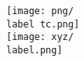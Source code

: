 \documentclass[aspectratio=169]{beamer}
\begin{document}
{\begin{frame}
    \hspace*{-0.05\linewidth}%
    \begin{minipage}{0.45\linewidth}
        \vspace*{4mm}%
        \texttt{[image: png/\\label tc.png]}\\[-2mm]
        \texttt{[image: xyz/\\label.png]}%
    \end{minipage}%
    \hspace*{-0.05\linewidth}%
\end{frame}
}%
\end{document}
